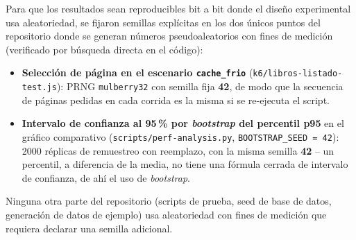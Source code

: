 Para que los resultados sean reproducibles bit a bit donde el diseño
experimental usa aleatoriedad, se fijaron semillas explícitas en los dos
únicos puntos del repositorio donde se generan números pseudoaleatorios
con fines de medición (verificado por búsqueda directa en el código):

\begin{itemize}[leftmargin=1.2cm]
  \item \textbf{Selección de página en el escenario \texttt{cache\_frio}}
    (\texttt{k6/libros-listado-test.js}): PRNG \texttt{mulberry32} con
    semilla fija \textbf{42}, de modo que la secuencia de páginas pedidas
    en cada corrida es la misma si se re-ejecuta el script.
  \item \textbf{Intervalo de confianza al 95\,\% por \emph{bootstrap} del
    percentil p95} en el gráfico comparativo
    (\texttt{scripts/perf-analysis.py},
    \texttt{BOOTSTRAP\_SEED = 42}): 2000 réplicas de remuestreo con
    reemplazo, con la misma semilla \textbf{42} -- un percentil, a
    diferencia de la media, no tiene una fórmula cerrada de intervalo de
    confianza, de ahí el uso de \emph{bootstrap}.
\end{itemize}

Ninguna otra parte del repositorio (scripts de prueba, seed de base de
datos, generación de datos de ejemplo) usa aleatoriedad con fines de
medición que requiera declarar una semilla adicional.
